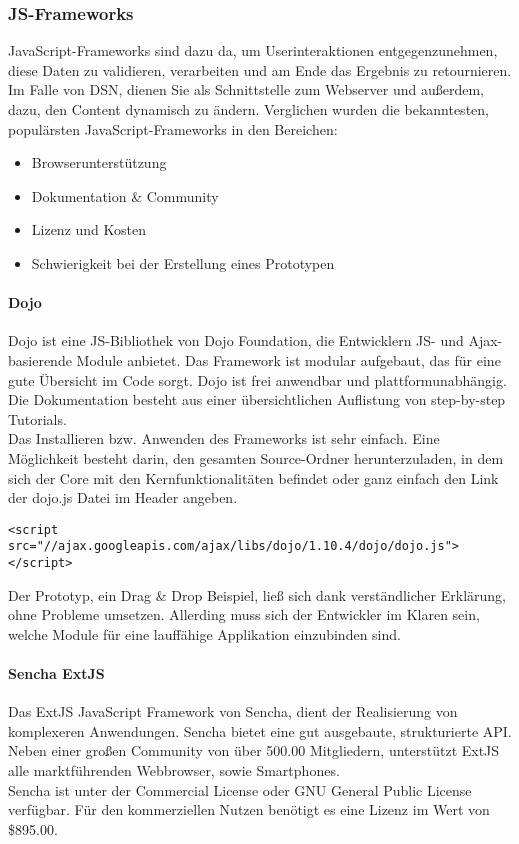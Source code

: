 \subsubsection{JS-Frameworks}
JavaScript-Frameworks sind dazu da, um Userinteraktionen entgegenzunehmen, diese Daten zu validieren, verarbeiten und am Ende das Ergebnis zu retournieren.\\
Im Falle von DSN, dienen Sie als Schnittstelle zum Webserver und außerdem, dazu, den Content dynamisch zu ändern. Verglichen wurden die bekanntesten, populärsten JavaScript-Frameworks in den Bereichen:
\begin{itemize}
\item Browserunterstützung
\item Dokumentation \& Community
\item Lizenz und Kosten
\item Schwierigkeit bei der Erstellung eines Prototypen
\end{itemize}
\paragraph{Dojo}
Dojo ist eine JS-Bibliothek von Dojo Foundation, die Entwicklern JS- und Ajax-basierende Module anbietet. Das Framework ist modular aufgebaut, das für eine gute Übersicht im Code sorgt. Dojo ist frei anwendbar und plattformunabhängig. Die Dokumentation besteht aus einer übersichtlichen Auflistung von step-by-step Tutorials. \cite{DOJO}\\

Das Installieren bzw. Anwenden des Frameworks ist sehr einfach. Eine Möglichkeit besteht darin, den gesamten Source-Ordner herunterzuladen, in dem sich der Core mit den Kernfunktionalitäten befindet oder ganz einfach den Link der dojo.js Datei im Header angeben.
\begin{lstlisting}[caption={Dojo einbinden\cite{DOJODOWN}}]
<script src="//ajax.googleapis.com/ajax/libs/dojo/1.10.4/dojo/dojo.js">
</script>
\end{lstlisting}

Der Prototyp, ein Drag \& Drop Beispiel, ließ sich dank verständlicher Erklärung, ohne Probleme umsetzen. Allerding muss sich der Entwickler im Klaren sein, welche Module für eine lauffähige Applikation einzubinden sind. \cite{DOJOINFO}

\paragraph{Sencha ExtJS}
Das ExtJS JavaScript Framework von Sencha, dient der Realisierung von komplexeren Anwendungen. Sencha bietet eine gut ausgebaute, strukturierte API. Neben einer großen Community von über 500.00 Mitgliedern, unterstützt ExtJS alle marktführenden Webbrowser, sowie Smartphones.\\
Sencha ist unter der Commercial License oder GNU General Public License verfügbar. Für den kommerziellen Nutzen benötigt es eine Lizenz im Wert von \$895.00.\cite{SENCHA}\\


